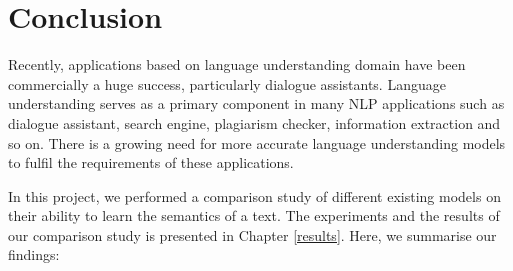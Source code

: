 \documentclass[12pt]{report} %
\begin{document}
\chapter{Conclusion}

Recently, applications based on language understanding domain have been commercially a huge success, particularly dialogue assistants. Language understanding serves as a primary component in many NLP applications such as dialogue assistant, search engine, plagiarism checker, information extraction and so on. There is a growing need for more accurate language understanding models to fulfil the requirements of these applications. 

In this project, we performed a comparison study of  different existing models on their ability to learn the semantics of a text.  
The experiments and the results of our comparison study is presented in Chapter \ref{results}. Here, we summarise our findings:
\end{document}
